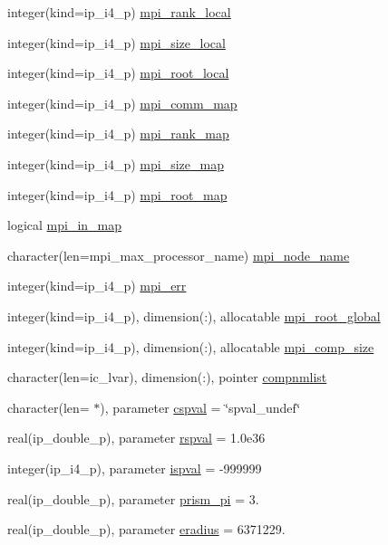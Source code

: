 \begin{DoxyCompactItemize}
integer(kind=ip\+\_\+i4\+\_\+p) \hyperlink{namespacemod__oasis__data_a811747a1592795f860854f09f19d4c25}{mpi\+\_\+rank\+\_\+local}
\item 
integer(kind=ip\+\_\+i4\+\_\+p) \hyperlink{namespacemod__oasis__data_a617f69fb4d4bb96a94f83a124b4d0030}{mpi\+\_\+size\+\_\+local}
\item 
integer(kind=ip\+\_\+i4\+\_\+p) \hyperlink{namespacemod__oasis__data_a2c468f26bc0c9b2ad5d54d68733e7047}{mpi\+\_\+root\+\_\+local}
\item 
integer(kind=ip\+\_\+i4\+\_\+p) \hyperlink{namespacemod__oasis__data_a8ff971286c1f235b8a328b3298f58a9b}{mpi\+\_\+comm\+\_\+map}
\item 
integer(kind=ip\+\_\+i4\+\_\+p) \hyperlink{namespacemod__oasis__data_a5e29025a6d83c7a01f88febbb734b7e9}{mpi\+\_\+rank\+\_\+map}
\item 
integer(kind=ip\+\_\+i4\+\_\+p) \hyperlink{namespacemod__oasis__data_ac4a6f10dab1d3078f8467465c21b9fdd}{mpi\+\_\+size\+\_\+map}
\item 
integer(kind=ip\+\_\+i4\+\_\+p) \hyperlink{namespacemod__oasis__data_a177c2b47ae4c69407d55817cd468b0ae}{mpi\+\_\+root\+\_\+map}
\item 
logical \hyperlink{namespacemod__oasis__data_a799f6f0a442fcc2ab9960814b8b1b74a}{mpi\+\_\+in\+\_\+map}
\item 
character(len=mpi\+\_\+max\+\_\+processor\+\_\+name) \hyperlink{namespacemod__oasis__data_ad186b77d375be587e4f198ca45026d2e}{mpi\+\_\+node\+\_\+name}
\item 
integer(kind=ip\+\_\+i4\+\_\+p) \hyperlink{namespacemod__oasis__data_abd48a08a17f07ec656912d9b2b7b7922}{mpi\+\_\+err}
\item 
integer(kind=ip\+\_\+i4\+\_\+p), dimension(\+:), allocatable \hyperlink{namespacemod__oasis__data_a7f03d4afc0c91a42b13ddcf7ec082e51}{mpi\+\_\+root\+\_\+global}
\item 
integer(kind=ip\+\_\+i4\+\_\+p), dimension(\+:), allocatable \hyperlink{namespacemod__oasis__data_aac77b331ab5a1af2e2443d6e83c755e4}{mpi\+\_\+comp\+\_\+size}
\item 
character(len=ic\+\_\+lvar), dimension(\+:), pointer \hyperlink{namespacemod__oasis__data_a8127239627205ac7d60ce6358e6028ae}{compnmlist}
\item 
character(len= $\ast$), parameter \hyperlink{namespacemod__oasis__data_acfb160b3d147e7cb667b0dc0f5bb2960}{cspval} = \char`\"{}spval\+\_\+undef\char`\"{}
\item 
real(ip\+\_\+double\+\_\+p), parameter \hyperlink{namespacemod__oasis__data_a3fea2837639caadabd693f405693edbb}{rspval} = 1.\+0e36
\item 
integer(ip\+\_\+i4\+\_\+p), parameter \hyperlink{namespacemod__oasis__data_a66bd35eca1454b6d8c8ac0449f2ca475}{ispval} = -\/999999
\item 
real(ip\+\_\+double\+\_\+p), parameter \hyperlink{namespacemod__oasis__data_ad5c84ea4b3063c2a3883b6d6571afeb0}{prism\+\_\+pi} = 3.
\item 
real(ip\+\_\+double\+\_\+p), parameter \hyperlink{namespacemod__oasis__data_a7f361db125e5554d0427e964b698f10c}{eradius} = 6371229.
\end{DoxyCompactItemize}


